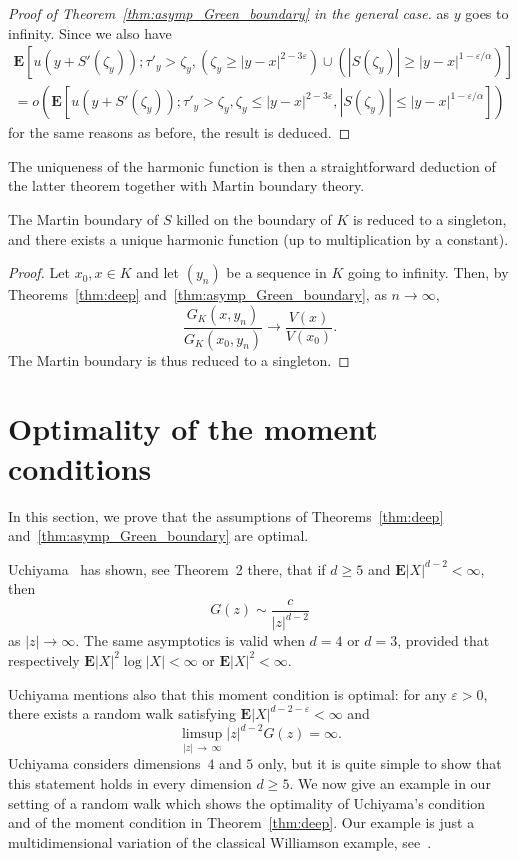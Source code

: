 \documentclass[AHL,Unicode,longabstracts,published]{cedram}
\newcommand{\e}{\mathbf{E}}
\renewcommand{\epsilon}{\varepsilon}
\renewcommand{\ge}{\geqslant}
\renewcommand{\leq}{\leqslant}
\renewcommand{\geq}{\geqslant}
\begin{document}
\begin{proof}[Proof of Theorem~\ref{thm:asymp_Green_boundary} in the general case]
as $y$ goes to infinity. Since we also have
\begin{multline*}
\e\left[u\left(y+S'(\zeta_{y})\right);\tau'_{y}>\zeta_{y},\left(\zeta_{y}\geq |y-x|^{2-3\epsilon}\right)\cup\left(\left|S\left(\zeta_{y}\right)\right| \geq |y-x|^{1-\epsilon/\alpha}\right)\right]\\
=o\left(\e\left[u\left(y+S'(\zeta_{y})\right);\tau'_{y}>\zeta_{y},\zeta_{y}\leq |y-x|^{2-3\epsilon},\left|S(\zeta_{y})\right| \leq | y-x|^{1-\epsilon/\alpha}\right]\right)
\end{multline*}
for the same reasons as before, the result is deduced.
\end{proof}

The uniqueness of the harmonic function is then a straightforward deduction of the latter theorem together with Martin boundary theory.
\begin{coro}
The Martin boundary of $S$ killed on the boundary of ${K}$ is reduced to a singleton, and there exists a unique harmonic function (up to multiplication by a constant).
\end{coro}
\begin{proof}
Let $x_{0},x\in{K}$ and let $(y_{n})$ be a sequence in ${K}$ going to infinity. Then, by Theorems~\ref{thm:deep} and~\ref{thm:asymp_Green_boundary}, as $n\to \infty$,
\[
\frac{G_K(x,y_{n})}{G_K(x_{0},y_{n})}\to\frac{V(x)}{V(x_{0})}.
\]
The Martin boundary is thus reduced to a singleton.
\end{proof}


\section{Optimality of the moment conditions}\label{sec:optimal}

In this section, we prove that the assumptions of Theorems~\ref{thm:deep} and~\ref{thm:asymp_Green_boundary} are optimal.

Uchiyama~\cite{Uc-98} has shown, see Theorem~2 there, that if $d\ge 5$ and $\e| X|^{d-2}<\infty$, then
\[
G(z)\sim\frac{c}{|z|^{d-2}}
\]
as $| z|\to\infty$. The same asymptotics is valid when $d=4$ or $d=3$, provided that respectively $\e| X|^2\log| X|<\infty$ or $\e| X|^2<\infty$.

Uchiyama mentions also that this moment condition is optimal: for any $\varepsilon>0$, there exists a random walk satisfying $\e| X|^{d-2-\varepsilon}<\infty$ and
\[
\limsup_{|z|\,\to\,\infty}| z|^{d-2}G(z)=\infty.
\]
Uchiyama considers dimensions~$4$ and $5$ only, but it is quite simple to show that this statement holds in every dimension $d\ge5$. We now give an example in our setting of a random walk which shows the optimality of Uchiyama's condition and of the moment condition in Theorem~\ref{thm:deep}. Our example is just a multidimensional variation of the classical Williamson example, see~\cite{Wi-68}.
\end{document}
